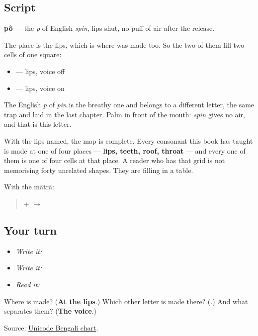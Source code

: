 \subsection*{Script}
\begin{quote}
\end{quote}

\textbf{pô} — the \emph{p} of English \emph{spin}, lips shut, no puff of air after the release.

The place is the lips, which is where \textbf{} was made too. So the two of them fill two cells of one square:

\begin{itemize}
\raggedright
  \item \textbf{} — lips, voice off
  \item \textbf{} — lips, voice on
\end{itemize}

The English \emph{p} of \emph{pin} is the breathy one and belongs to a different letter, the same trap \textbf{} and \textbf{} laid in the last chapter. Palm in front of the mouth: \emph{spin} gives no air, and that is this letter.

With the lips named, the map is complete. Every consonant this book has taught is made at one of four places — \textbf{lips, teeth, roof, throat} — and every one of them is one of four cells at that place. A reader who has that grid is not memorising forty unrelated shapes. They are filling in a table.

With the mātrā:

\begin{quote}
\textbf{} + \textbf{} $\to$ \textbf{}
\end{quote}

\subsection*{Your turn}
\begin{itemize}
\raggedright
  \item \emph{Write it:} 
  \item \emph{Write it:}  
  \item \emph{Read it:} 
\end{itemize}

\begin{tcolorbox}[breakable,colback=teal!4,colframe=teal!35!black,title={Before you move on}]
Where is \textbf{} made? (\textbf{At the lips}.) Which other letter is made there? (\textbf{}.) And what separates them? (\textbf{The voice}.)

Source: \href{https://www.unicode.org/charts/PDF/U0980.pdf}{Unicode Bengali chart}.
\end{tcolorbox}
